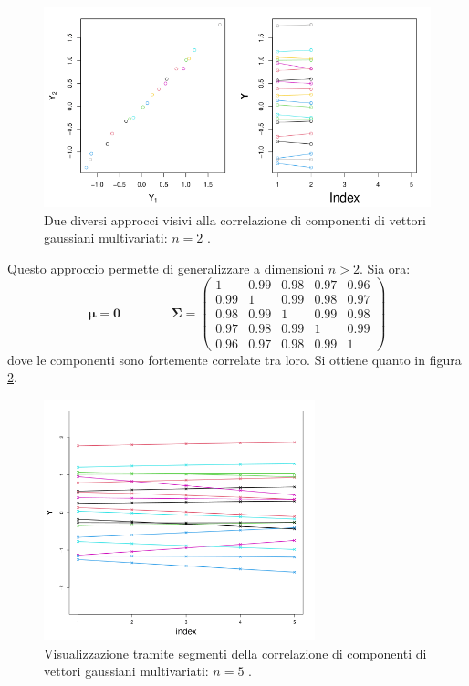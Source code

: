 \begin{figure}[h]
    \centering
    \includegraphics[width=\textwidth]{images/Gaussiane/CorrelazioneMultidimensionale.png}
    \caption{Due diversi approcci visivi alla correlazione di componenti di vettori gaussiani multivariati: $n=2$ \cite{wilkinson_introduction_2020}.}
    \label{correlazione4}
\end{figure}


\newpage 

Questo approccio permette di generalizzare a dimensioni $n>2$. Sia ora:
\[\bm{\mu}=\bm{0} \qquad\qquad \bm{\Sigma}=\begin{pmatrix}1&0.99&0.98&0.97&0.96\\0.99&1&0.99&0.98&0.97\\0.98&0.99&1&0.99&0.98\\0.97&0.98&0.99&1&0.99\\0.96&0.97&0.98&0.99&1 \end{pmatrix}
\]
dove le componenti sono fortemente correlate tra loro. Si ottiene quanto in figura \ref{correlazione5}.

\begin{figure}[h]
    \centering
    \includegraphics[width=0.7\textwidth]{images/Gaussiane/CorrelazioneMultidimensionale2.png}
    \caption{Visualizzazione tramite segmenti della correlazione di componenti di vettori gaussiani multivariati: $n=5$ \cite{wilkinson_introduction_2020}.}
    \label{correlazione5}
\end{figure}

